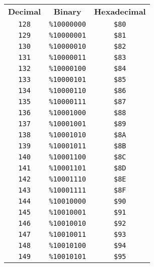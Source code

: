\begin{multicols}{2}
  \begin{center}
  \begin{tabular}{|c|c|c|}
  \hline
		\textbf{Decimal} & \textbf{Binary} & \textbf{Hexadecimal} \\ \hhline{|=|=|=|}   
  \texttt{128} & \texttt{\%10000000} &  \texttt{\$80} \\ \hline
 \texttt{129} & \texttt{\%10000001} &  \texttt{\$81} \\ \hline
 \texttt{130} & \texttt{\%10000010} &  \texttt{\$82} \\ \hline
 \texttt{131} & \texttt{\%10000011} &  \texttt{\$83} \\ \hline
 \texttt{132} & \texttt{\%10000100} &  \texttt{\$84} \\ \hline
 \texttt{133} & \texttt{\%10000101} &  \texttt{\$85} \\ \hline
 \texttt{134} & \texttt{\%10000110} &  \texttt{\$86} \\ \hline
 \texttt{135} & \texttt{\%10000111} &  \texttt{\$87} \\ \hline
 \texttt{136} & \texttt{\%10001000} &  \texttt{\$88} \\ \hline
 \texttt{137} & \texttt{\%10001001} &  \texttt{\$89} \\ \hline
 \texttt{138} & \texttt{\%10001010} &  \texttt{\$8A} \\ \hline
 \texttt{139} & \texttt{\%10001011} &  \texttt{\$8B} \\ \hline
 \texttt{140} & \texttt{\%10001100} &  \texttt{\$8C} \\ \hline
 \texttt{141} & \texttt{\%10001101} &  \texttt{\$8D} \\ \hline
 \texttt{142} & \texttt{\%10001110} &  \texttt{\$8E} \\ \hline
 \texttt{143} & \texttt{\%10001111} &  \texttt{\$8F} \\ \hline
 \texttt{144} & \texttt{\%10010000} &  \texttt{\$90} \\ \hline
 \texttt{145} & \texttt{\%10010001} &  \texttt{\$91} \\ \hline
 \texttt{146} & \texttt{\%10010010} &  \texttt{\$92} \\ \hline
 \texttt{147} & \texttt{\%10010011} &  \texttt{\$93} \\ \hline
 \texttt{148} & \texttt{\%10010100} &  \texttt{\$94} \\ \hline
 \texttt{149} & \texttt{\%10010101} &  \texttt{\$95} \\ \hline

\end{tabular}
\end{center}
\end{multicols}
